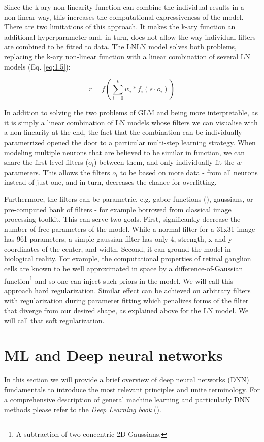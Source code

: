 Since the k-ary non-linearity function can combine the individual results in a non-linear way, this increases the computational expressiveness of the model. There are two limitations of this approach. It makes the k-ary function an additional hyperparameter and, in turn, does not allow the way individual filters are combined to be fitted to data. The LNLN model solves both problems, replacing the k-ary non-linear function with a linear combination of several LN models (Eq. \ref{eq:1.5}):

\begin{equation}\label{eq:1.5}
    r = f(\sum_{i=0}^{k} w_i * f_i(s \cdot o_i))
\end{equation}

In addition to solving the two problems of GLM and being more interpretable, as it is simply a linear combination of LN models whose filters we can visualise with a non-linearity at the end, the fact that the combination can be individually parametrized opened the door to a particular multi-step learning strategy. When modeling multiple neurons that are believed to be similar in function, we can share the first level filters ($o_i$) between them, and only individually fit the $w$ parameters. This allows the filters $o_i$ to be based on more data - from all neurons instead of just one, and in turn, decreases the chance for overfitting.

\label{intr:hard-reg}\label{intr:soft-reg}Furthermore, the filters can be parametric, e.g. gabor functions (\citep{Kay2008}), gaussians, or pre-computed bank of filters - for example borrowed from classical image processing toolkit. This can serve two goals. First, significantly decrease the number of free parameters of the model. While a normal filter for a 31x31 image has 961 parameters, a simple gaussian filter has only 4, strength, x and y coordinates of the center, and width. Second, it can ground the model in biological reality. For example, the computational properties of retinal ganglion cells are known to be well approximated in space by a difference-of-Gaussian function\footnote{A subtraction of two concentric 2D Gaussians.} and so one can inject such priors in the model. We will call this approach hard regularization. Similar effect can be achieved on arbitrary filters with regularization during parameter fitting which penalizes forms of the filter that diverge from our desired shape, as explained above for the LN model. We will call that soft regularization.

\section{ML and Deep neural networks}
In this section we will provide a brief overview of deep neural networks (DNN) fundamentals to introduce the most relevant principles and unite terminology. For a comprehensive description of general machine learning and particularly DNN methods please refer to the \textit{Deep Learning book} (\citep{Goodfellow-et-al-2016}).

